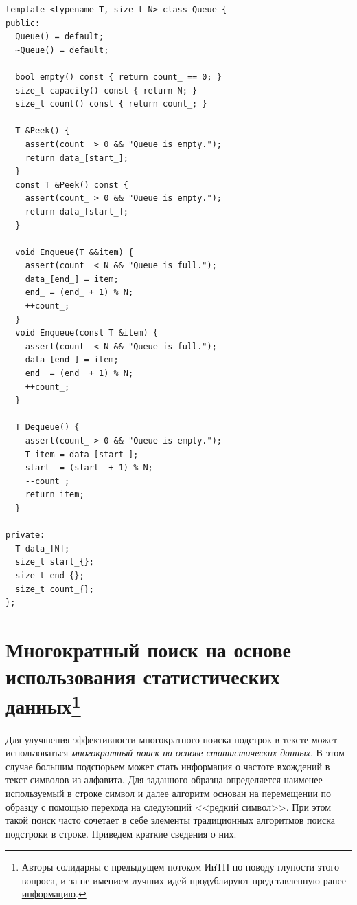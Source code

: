 \begin{verbatim}
template <typename T, size_t N> class Queue {
public:
  Queue() = default;
  ~Queue() = default;

  bool empty() const { return count_ == 0; }
  size_t capacity() const { return N; }
  size_t count() const { return count_; }

  T &Peek() {
    assert(count_ > 0 && "Queue is empty.");
    return data_[start_];
  }
  const T &Peek() const {
    assert(count_ > 0 && "Queue is empty.");
    return data_[start_];
  }

  void Enqueue(T &&item) {
    assert(count_ < N && "Queue is full.");
    data_[end_] = item;
    end_ = (end_ + 1) % N;
    ++count_;
  }
  void Enqueue(const T &item) {
    assert(count_ < N && "Queue is full.");
    data_[end_] = item;
    end_ = (end_ + 1) % N;
    ++count_;
  }

  T Dequeue() {
    assert(count_ > 0 && "Queue is empty.");
    T item = data_[start_];
    start_ = (start_ + 1) % N;
    --count_;
    return item;
  }

private:
  T data_[N];
  size_t start_{};
  size_t end_{};
  size_t count_{};
};
\end{verbatim}

%
%

\section{Многократный поиск на основе использования статистических данных\footnote{
    Авторы солидарны с предыдущем потоком ИиТП по поводу глупости этого вопроса, и за не имением лучших
    идей продублируют представленную ранее
    \href{https://docs.google.com/document/d/1IDx1FsePF0Gved69eeGE0gimE9MP1xxI_EY23wfWqO0/edit?tab=t.0}{информацию}.}}

Для улучшения эффективности многократного поиска подстрок в тексте может использоваться
\textit{многократный поиск на основе статистических данных}. В этом случае большим подспорьем может стать информация о частоте
вхождений в текст символов из алфавита. Для заданного образца определяется наименее используемый в строке символ и далее алгоритм
основан на перемещении по образцу с помощью перехода на следующий <<редкий символ>>. При этом такой поиск часто сочетает в себе
элементы традиционных алгоритмов поиска подстроки в строке. Приведем краткие сведения о них.

